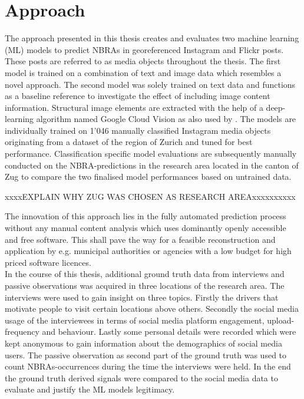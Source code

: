 \section{Approach}
The approach presented in this thesis creates and evaluates two machine learning (ML) models to predict NBRAs in georeferenced Instagram and Flickr posts. These posts are referred to as media objects throughout the thesis. The first model is trained on a combination of text and image data which resembles a novel approach. The second model was solely trained on text data and functions as a baseline reference to investigate the effect of including image content information. Structural image elements are extracted with the help of a deep-learning algorithm named Google Cloud Vision as also used by \textcite{Richards2018}. The models are individually trained on 1'046 manually classified Instagram media objects originating from a dataset of the region of Zurich \parencite{Gruzd2016} and tuned for best performance. Classification specific model evaluations are subsequently manually conducted on the NBRA-predictions in the research area located in the canton of Zug to compare the two finalised model performances based on untrained data. 

xxxxEXPLAIN WHY ZUG WAS CHOSEN AS RESEARCH AREAxxxxxxxxxx

The innovation of this approach lies in the fully automated prediction process without any manual content analysis which uses dominantly openly accessible and free software. This shall pave the way for a feasible reconstruction and application by e.g. municipal authorities or agencies with a low budget for high priced software licences. \\
\newline
In the course of this thesis, additional ground truth data from interviews and passive observations was acquired in three locations of the research area. The interviews were used to gain insight on three topics. Firstly the drivers that motivate people to visit certain locations above others. Secondly the social media usage of the interviewees in terms of social media platform engagement, upload-frequency and behaviour. Lastly some personal details were recorded which were kept anonymous to gain information about the demographics of social media users. The passive observation as second part of the ground truth was used to count NBRAs-occurrences during the time the interviews were held. In the end the ground truth derived signals were compared to the social media data to evaluate and justify the ML models legitimacy.


